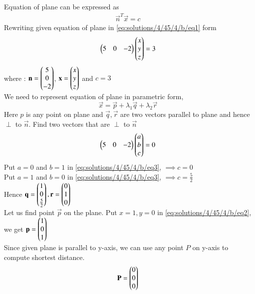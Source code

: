Equation of plane can be expressed as 
\begin{align}\label{eq:solutions/4/45/4/b/eq1}
	\vec{n}^T\vec{x} = c
\end{align}
Rewriting given equation of plane in \eqref{eq:solutions/4/45/4/b/eq1} form
\begin{align}\label{eq:solutions/4/45/4/b/eq2}
	\begin{pmatrix}5 & 0 & -2\end{pmatrix}\begin{pmatrix}x\\y\\z\end{pmatrix} = 3
\end{align}
where :
$\mathbf{n}=\begin{pmatrix}5\\0\\-2\end{pmatrix}$, $\mathbf{x} = \begin{pmatrix}x\\y\\z\end{pmatrix}$  and $c=3$\\
We need to represent equation of plane in parametric form,
\begin{equation}\label{eq:solutions/4/45/4/b/eq3}
	\vec{x} = \vec{p} + \lambda_1\vec{q} + \lambda_2\vec{r}
\end{equation}
Here $p$ is any point on plane and $\vec{q}, \vec{r}$ are two vectors parallel to plane and hence $\perp$ to $\vec{n}$. Find two vectors that are $\perp$ to $\vec{n}$
\begin{align}\label{eq:solutions/4/45/4/b/eq4}
	\begin{pmatrix}5 & 0 &-2\end{pmatrix}\begin{pmatrix}a\\b\\c\end{pmatrix} = 0
\end{align}
Put $a=0$ and $b=1$ in \eqref{eq:solutions/4/45/4/b/eq3}, $\implies c=0$\\
Put $a=1$ and $b=0$ in \eqref{eq:solutions/4/45/4/b/eq3}, $\implies c=\frac{5}{2}$\\
Hence $\mathbf{q} = \begin{pmatrix}1\\0\\\frac{5}{2}\end{pmatrix}, \mathbf{r} = \begin{pmatrix}0\\1\\0\end{pmatrix}$\\
Let us find point $\vec{p}$ on the plane. Put $x=1,y=0$ in \eqref{eq:solutions/4/45/4/b/eq2}, we get $\mathbf{p} = \begin{pmatrix}1\\0\\1\end{pmatrix}$\\
Since given plane is parallel to y-axis, we can use any point $P$ on y-axis to compute shortest distance. 
\begin{equation}\label{eq:solutions/4/45/4/b/eq5}
	\mathbf{P} = \begin{pmatrix}0\\0\\0\end{pmatrix}
\end{equation}
